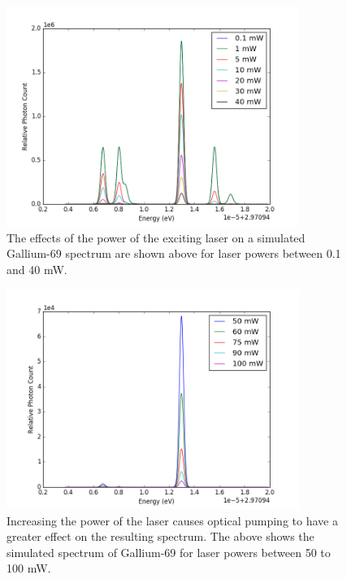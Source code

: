 \begin{figure}[h!]
\begin{center}
\includegraphics[width = 0.85\textwidth]{Graphics/Power_comparison(1-40).png}
\caption[The effects of the power of the exciting laser on a simulated Gallium-69 spectrum for powers between 0.1 and 40 mW.]{\small The effects of the power of the exciting laser on a simulated Gallium-69 spectrum are shown above for laser powers between 0.1 and 40 mW.}
\end{center}
\label{power1-40}
\end{figure}

\begin{figure}[h!]
\begin{center}
\includegraphics[width = 0.85\textwidth]{Graphics/Power_comparison(50-100).png}
\caption[The effects of the power of the exciting laser on a simulated Gallium-69 spectrum for powers between 50 and 100 mW.]{\small Increasing the power of the laser causes optical pumping to have a greater effect on the resulting spectrum. The above shows the simulated spectrum of Gallium-69 for laser powers between 50 to 100 mW.}
\label{power50-100}
\end{center}
\end{figure}

